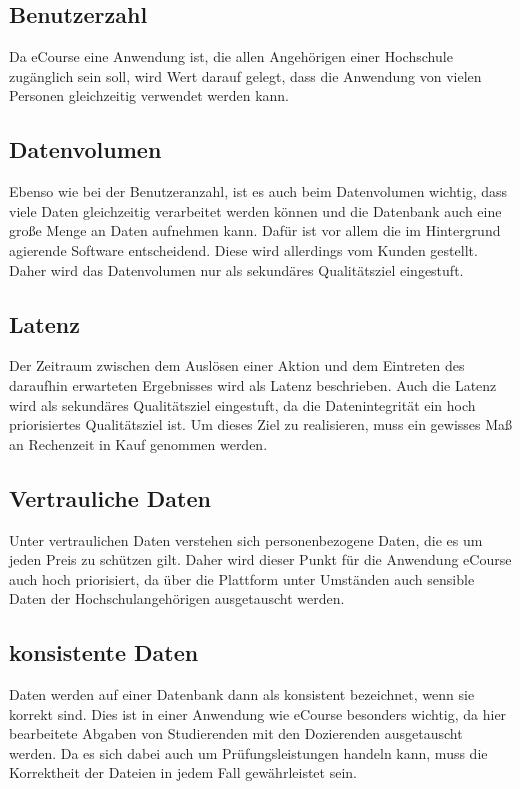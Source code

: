 \subsection{Benutzerzahl}
Da eCourse eine Anwendung ist, die allen Angehörigen einer Hochschule zugänglich sein soll, wird Wert darauf gelegt, dass die Anwendung von vielen Personen gleichzeitig verwendet werden kann.

\subsection{Datenvolumen}
Ebenso wie bei der Benutzeranzahl, ist es auch beim Datenvolumen wichtig, dass viele Daten gleichzeitig verarbeitet werden können und die Datenbank auch eine große Menge an Daten aufnehmen kann. Dafür ist vor allem die im Hintergrund agierende Software entscheidend. Diese wird allerdings vom Kunden gestellt. Daher wird das Datenvolumen nur als sekundäres Qualitätsziel eingestuft.

\subsection{Latenz}
Der Zeitraum zwischen dem Auslösen einer Aktion und dem Eintreten des daraufhin erwarteten Ergebnisses wird als Latenz beschrieben.
Auch die Latenz wird als sekundäres Qualitätsziel eingestuft, da die Datenintegrität ein hoch priorisiertes Qualitätsziel ist. Um dieses Ziel zu realisieren, muss ein gewisses Maß an Rechenzeit in Kauf genommen werden.

\subsection{Vertrauliche Daten}
\label{sec:vertrauen}
Unter vertraulichen Daten verstehen sich personenbezogene Daten, die es um jeden Preis zu schützen gilt. Daher wird dieser Punkt für die Anwendung eCourse auch hoch priorisiert, da über die Plattform unter Umständen auch sensible Daten der Hochschulangehörigen ausgetauscht werden.

\subsection{konsistente Daten}
Daten werden auf einer Datenbank dann als konsistent bezeichnet, wenn sie korrekt sind. Dies ist in einer Anwendung wie eCourse besonders wichtig, da hier \gls{bearbeitete Abgabe}n von \gls{Studierende}n mit den \gls{Dozierende}n ausgetauscht werden. Da es sich dabei auch um Prüfungsleistungen handeln kann, muss die Korrektheit der Dateien in jedem Fall gewährleistet sein.